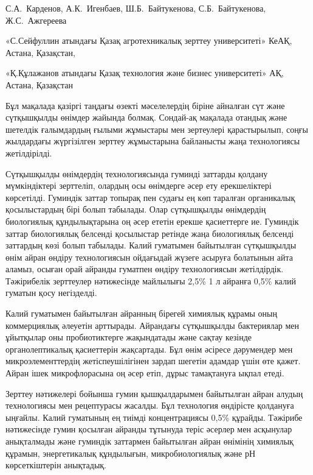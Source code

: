 
\begin{header}

С.А.~Карденов\envelope,
А.К.~Игенбаев,
Ш.Б.~Байтукенова,
С.Б.~Байтукенова,
Ж.С.~Ажгереева
\end{header}

\begin{affil}
«С.Сейфуллин атындағы Қазақ агротехникалық зерттеу университеті» КеАҚ, Астана, Қазақстан,

«Қ.Құлажанов атындағы Қазақ технология және бизнес университеті» АҚ, Астана, Қазақстан

\end{affil}

Бұл мақалада қазіргі таңдағы өзекті мәселелердің біріне айналған сүт
және сүтқышқылды өнімдер жайында болмақ. Сондай-ақ мақалада отандық және
шетелдік ғалымдардың ғылыми жұмыстары мен зертеулері қарастырылып, соңғы
жылдардағы жүргізілген зерттеу жұмыстарына байланысты жаңа технологиясы
жетілдірілді.

Сүтқышқылды өнімдердің технологиясында гуминді заттарды қолдану
мүмкіндіктері зерттеліп, олардың осы өнімдерге әсер ету ерекшеліктері
көрсетілді. Гуминдік заттар топырақ пен судағы ең көп таралған
органикалық қосылыстардың бірі болып табылады. Олар сүтқышқылды
өнімдердің биологиялық құндылықтарына оң әсер ететін ерекше қасиеттерге
ие. Гуминдік заттар биологиялық белсенді қосылыстар ретінде жаңа
биологиялық белсенді заттардың көзі болып табылады. Калий гуматымен
байытылған сүтқышқылды өнім айран өндіру технологиясын ойдағыдай жүзеге
асыруға болатынын айта аламыз, осыған орай айранды гуматпен өндіру
технологиясын жетілдірдік. Тәжірибелік зерттеулер нәтижесінде майлылығы
2,5\% 1 л айранға 0,5\% калий гуматын қосу негізделді.

Калий гуматымен байытылған айранның бірегей химиялық құрамы оның
коммерциялық әлеуетін арттырады. Айрандағы сүтқышқылды бактериялар мен
ұйытқылар оны пробиотиктерге жа\-қындатады және сақтау кезінде
органолептикалық қасиеттерін жақсартады. Бұл өнім әсіресе дәрумендер мен
микроэлементтердің жетіспеушілігінен зардап шегетін адамдар үшін өте
қажет. Айран ішек микрофлорасына оң әсер етіп, дұрыс тамақтануға ықпал
етеді.

Зерттеу нәтижелері бойынша гумин қышқылдарымен байытылған айран алудың
технологиясы мен рецептурасы жасалды. Бұл технология өндірісте қолдануға
ыңғайлы. Калий гуматының ең тиімді концентрациясы 0,5\% құрайды.
Тәжірибе нәтижесінде гумин қосылған айранды тұтынуда теріс әсерлер мен
асқынулар анықталмады және гуминдік заттармен байытылған айран өнімінің
химиялық құрамын, энергетикалық құндылығын, микробиологиялық және рН
көрсеткіштерін анықтадық.

